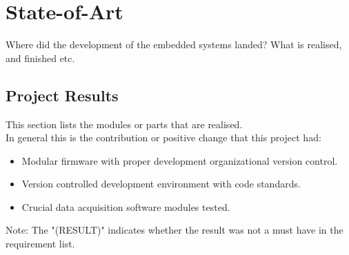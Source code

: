 \chapter{State-of-Art}
\label{chapter:conc}
Where did the development of the embedded systems landed? What is realised, and finished etc. 
\section{Project Results}
This section lists the modules or parts that are realised. \\
In general this is the contribution or positive change that this project had:\\
\begin{itemize}
    \item Modular firmware with proper development organizational version control.
    \item Version controlled development environment with code standards.
    \item Crucial data acquisition software modules tested.
\end{itemize}
Note: The "(RESULT)" indicates whether the result was not a must have in the requirement list.
